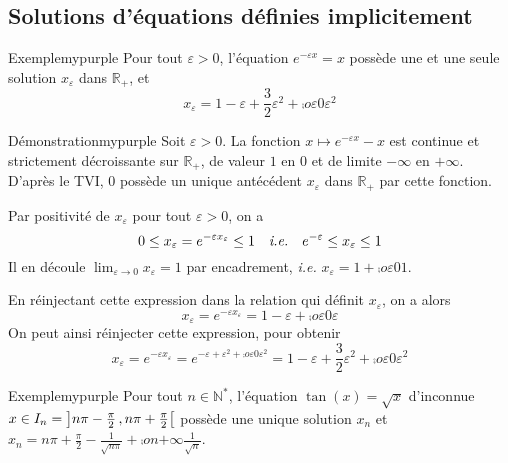     \subsection{Solutions d’équations définies implicitement}

    \begin{omed}{Exemple}{mypurple}
        Pour tout $\varepsilon > 0$, l’équation $e^{-\varepsilon x} = x$ possède une et une seule solution $x_{\varepsilon}$ dans $\mathbb{R}_+$, 
        et 
        \[ x_{\varepsilon} = 1 - \varepsilon + \frac{3}{2} \varepsilon^2 + \comp{o}{\varepsilon}{0}{\varepsilon^2} \]    
    \end{omed}

    \begin{demo}{Démonstration}{mypurple}
        Soit $\varepsilon > 0$. La fonction $x \mapsto e^{-\varepsilon x} - x$ est continue et strictement décroissante sur $\mathbb{R}_+$, de valeur $1$ en $0$ et de limite $-\infty$ en $+\infty$. D’après le TVI, $0$ possède un unique antécédent $x_{\varepsilon}$ dans $\mathbb{R}_+$ par cette fonction.

        Par positivité de $x_{\varepsilon}$ pour tout $\varepsilon > 0$, on a 
        \[ 0 \leq x_{\varepsilon} = e^{-\varepsilon x_{\varepsilon}} \leq 1 \quad \text{\textit{i.e.}} \quad e^{-\varepsilon} \leq x_{\varepsilon} \leq 1 \] 
        Il en découle $\lim_{\varepsilon \to 0} x_{\varepsilon} = 1$ par encadrement, \textit{i.e.} $x_{\varepsilon} = 1 + \comp{o}{\varepsilon}{0}{1}$.
        
        En réinjectant cette expression dans la relation qui définit $x_{\varepsilon}$, on a alors 
        \[ x_{\varepsilon} = e^{-\varepsilon x_{\varepsilon}} = 1 - \varepsilon + \comp{o}{\varepsilon}{0}{\varepsilon} \]   
        On peut ainsi réinjecter cette expression, pour obtenir 
        \[ x_{\varepsilon} = e^{- \varepsilon x_{\varepsilon}} = e^{-\varepsilon + \varepsilon^2 + \comp{o}{\varepsilon}{0}{\varepsilon^2}} = 1 - \varepsilon + \frac{3}{2} \varepsilon^2 + \comp{o}{\varepsilon}{0}{\varepsilon^2} \]
    \end{demo}

    \begin{omed}{Exemple}{mypurple}
        Pour tout $n \in \mathbb{N}^*$, l’équation $\tan(x) = \sqrt{x}$ d’inconnue $x \in I_n = \left] n\pi - \frac{\pi}{2} \, , n \pi + \frac{\pi}{2} \right[$ possède une unique solution $x_n$ et $x_n = n \pi + \frac{\pi}{2} - \frac{1}{\sqrt{n \pi }} + \comp{o}{n}{+\infty}{\frac{1}{\sqrt{n}}}$.
    \end{omed}

